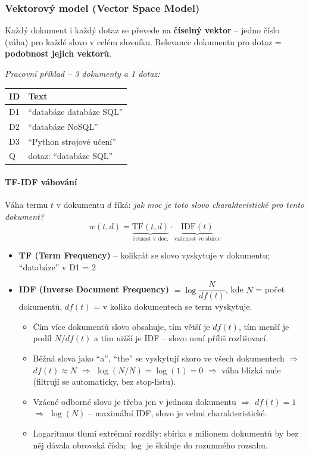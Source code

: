 \subsubsection{Vektorový model (Vector Space Model)}

Každý dokument i každý dotaz se převede na \textbf{číselný vektor} -- jedno číslo (váha) pro každé
slovo v celém slovníku. Relevance dokumentu pro dotaz = \textbf{podobnost jejich vektorů}.

\textit{Pracovní příklad -- 3 dokumenty a 1 dotaz:}
\begin{center}\footnotesize
\begin{tabular}{ll}
\toprule
\textbf{ID} & \textbf{Text} \\
\midrule
D1 & ``databáze databáze SQL'' \\
D2 & ``databáze NoSQL'' \\
D3 & ``Python strojové učení'' \\
Q  & dotaz: ``databáze SQL'' \\
\bottomrule
\end{tabular}
\end{center}

\paragraph{TF-IDF váhování}
Váha termu $t$ v dokumentu $d$ říká: \textit{jak moc je toto slovo charakteristické pro tento dokument?}
$$w(t,d) = \underbrace{\text{TF}(t,d)}_{\text{četnost v doc.}} \cdot \underbrace{\text{IDF}(t)}_{\text{vzácnost ve sbírce}}$$

\begin{itemize}
  \item \textbf{TF (Term Frequency)} -- kolikrát se slovo vyskytuje v dokumentu; ``databáze'' v D1 = 2
  \item \textbf{IDF (Inverse Document Frequency)} $= \log\dfrac{N}{df(t)}$, kde $N$ = počet dokumentů,
    $df(t)$ = v kolika dokumentech se term vyskytuje.
    \begin{itemize}
      \item Čím více dokumentů slovo obsahuje, tím větší je $df(t)$, tím menší je podíl $N/df(t)$
            a tím nižší je IDF -- slovo není příliš rozlišovací.
      \item Běžná slova jako ``a'', ``the'' se vyskytují skoro ve všech dokumentech
            $\Rightarrow$ $df(t) \approx N$ $\Rightarrow$ $\log(N/N) = \log(1) = 0$
            $\Rightarrow$ váha blízká nule (filtrují se automaticky, bez stop-listu).
      \item Vzácné odborné slovo je třeba jen v jednom dokumentu
            $\Rightarrow$ $df(t) = 1$ $\Rightarrow$ $\log(N)$ -- maximální IDF, slovo je velmi charakteristické.
      \item Logaritmus tlumí extrémní rozdíly: sbírka s milionem dokumentů by bez něj dávala
            obrovská čísla; $\log$ je škáluje do rozumného rozsahu.
    \end{itemize}
\end{itemize}

